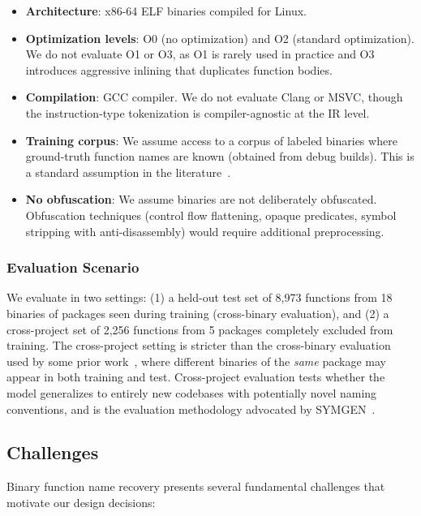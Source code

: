 \documentclass[sigconf,nonacm]{acmart}
\begin{document}
\begin{itemize}
    \item \textbf{Architecture}: x86-64 ELF binaries compiled for Linux.
    \item \textbf{Optimization levels}: O0 (no optimization) and O2 (standard optimization). We do not evaluate O1 or O3, as O1 is rarely used in practice and O3 introduces aggressive inlining that duplicates function bodies.
    \item \textbf{Compilation}: GCC compiler. We do not evaluate Clang or MSVC, though the instruction-type tokenization is compiler-agnostic at the IR level.
    \item \textbf{Training corpus}: We assume access to a corpus of labeled binaries where ground-truth function names are known (obtained from debug builds). This is a standard assumption in the literature~\cite{debin,nero,symlm,blens,symgen}.
    \item \textbf{No obfuscation}: We assume binaries are not deliberately obfuscated. Obfuscation techniques (control flow flattening, opaque predicates, symbol stripping with anti-disassembly) would require additional preprocessing.
\end{itemize}

\subsubsection{Evaluation Scenario}

We evaluate in two settings: (1) a held-out test set of 8,973 functions from 18 binaries of packages seen during training (cross-binary evaluation), and (2) a cross-project set of 2,256 functions from 5 packages completely excluded from training. The cross-project setting is stricter than the cross-binary evaluation used by some prior work~\cite{nero,symlm}, where different binaries of the \emph{same} package may appear in both training and test. Cross-project evaluation tests whether the model generalizes to entirely new codebases with potentially novel naming conventions, and is the evaluation methodology advocated by SYMGEN~\cite{symgen}.

\subsection{Challenges}
\label{sec:challenges}

Binary function name recovery presents several fundamental challenges that motivate our design decisions:
\end{document}
